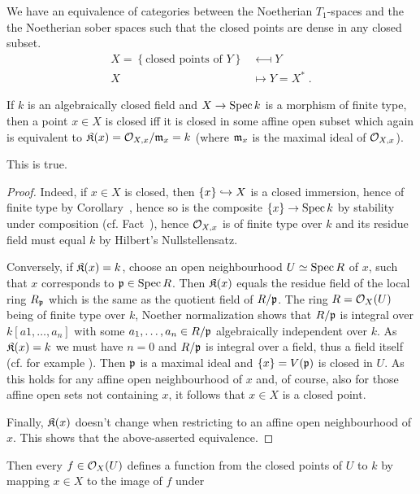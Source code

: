 \documentclass[a4paper,parskip=half,numbers=enddot, DIV=12]{scrreprt}
\begin{document}
\begin{fact}
    We have an equivalence of categories between the Noetherian $T_1$-spaces and the the Noetherian sober spaces such that the closed points are dense in any closed subset. 
    \begin{align*}
        X =\left\{\text{closed points of } Y\right\} &\longmapsfrom Y\\
        X&\longmapsto Y= X^*\;.
    \end{align*}
\end{fact}
If $k$ is an algebraically closed field and $X\morphism \Spec k$ is a morphism of finite type, then a point $x\in X$ is closed iff it is closed in some affine open subset which again is equivalent to $\mathfrak{K}(x)=\mathcal{O}_{X,x}/\mathfrak{m}_x = k$ (where $\mathfrak{m}_x$ is the maximal ideal of $\mathcal{O}_{X,x}$). 
\begin{claim*}
	This is true.
\end{claim*}
\begin{proof}
	Indeed, if $x\in X$ is closed, then $\{x\}\monomorphism X$ is a closed immersion, hence of finite type by Corollary~, hence so is the composite $\{x\}\morphism\Spec k$ by stability under composition (cf. Fact~), hence $\mathcal{O}_{X,x}$ is of finite type over $k$ and its residue field must equal $k$ by Hilbert's Nullstellensatz.
	
	Conversely, if $\mathfrak{K}(x)=k$, choose an open neighbourhood $U\simeq \operatorname{Spec} R$ of $x$, such that $x$ corresponds to $\mathfrak{p}\in\operatorname{Spec} R$. Then $\mathfrak{K}(x)$ equals the residue field of the local ring $R_{\mathfrak{p}}$ which is the same as the quotient field of $R/\mathfrak{p}$. The ring $R=\mathcal{O}_X(U)$ being of finite type over $k$, Noether normalization  shows that $R/\mathfrak{p}$ is integral over $k[a1,\ldots,a_n]$ with some $a_1,\ldots,a_n\in R/\mathfrak{p}$ algebraically independent over $k$. As $\mathfrak{K}(x)=k$ we must have $n=0$ and $R/\mathfrak{p}$ is integral over a field, thus a field itself (cf. for example \cite[Proposition~1.5.1]{alg1}). Then $\mathfrak{p}$ is a maximal ideal and $\{x\}=V(\mathfrak{p})$ is closed in $U$. As this holds for any affine open neighbourhood of $x$ and, of course, also for those affine open sets not containing $x$, it follows that $x\in X$ is a closed point.
	
	Finally, $\mathfrak{K}(x)$ doesn't change when restricting to an affine open neighbourhood of $x$. This shows that the above-asserted equivalence.
\end{proof}
Then every $f\in \mathcal{O}_X(U)$ defines a function from the closed points of $U$ to $k$ by mapping $x\in X$ to the image of $f$ under
\end{document}

